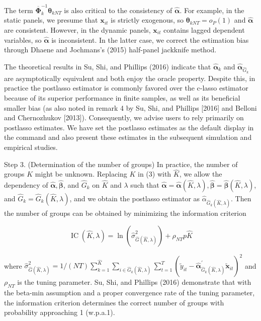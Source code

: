 \documentclass[10pt]{article}
\begin{document}
The term $\overline{\boldsymbol{\Phi}}_{k}^{-1} \boldsymbol{\theta}_{k N T}$ is also critical to the consistency of $\widehat{\boldsymbol{\alpha}}$. For example, in the static panels, we presume that $\mathbf{x}_{i t}$ is strictly exogenous, so $\boldsymbol{\theta}_{k N T}=o_{P}(1)$ and $\widehat{\boldsymbol{\alpha}}$ are consistent. However, in the dynamic panels, $\mathbf{x}_{i t}$ contains lagged dependent variables, so $\widehat{\boldsymbol{\alpha}}$ is inconsistent. In the latter case, we correct the estimation bias through Dhaene and Jochmans's (2015) half-panel jackknife method.

The theoretical results in Su, Shi, and Phillips (2016) indicate that $\widehat{\boldsymbol{\alpha}}_{k}$ and $\widehat{\boldsymbol{\alpha}}_{\widehat{G}_{k}}$ are asymptotically equivalent and both enjoy the oracle property. Despite this, in practice the postlasso estimator is commonly favored over the c-lasso estimator because of its superior performance in finite samples, as well as its beneficial smaller bias (as also noted in remark 4 by Su, Shi, and Phillips [2016] and Belloni and Chernozhukov [2013]). Consequently, we advise users to rely primarily on postlasso estimates. We have set the postlasso estimates as the default display in the command and also present these estimates in the subsequent simulation and empirical studies.

Step 3. (Determination of the number of groups) In practice, the number of groups $K$ might be unknown. Replacing $K$ in (3) with $\widehat{K}$, we allow the dependency of $\widehat{\boldsymbol{\alpha}}, \widehat{\boldsymbol{\beta}}$, and $\widehat{G}_{k}$ on $\widehat{K}$ and $\lambda$ such that $\widehat{\boldsymbol{\alpha}}=\widehat{\boldsymbol{\alpha}}(\widehat{K}, \lambda), \widehat{\boldsymbol{\beta}}=\widehat{\boldsymbol{\beta}}(\widehat{K}, \lambda)$, and $\widehat{G}_{k}=\widehat{G}_{k}(\widehat{K}, \lambda)$, and we obtain the postlasso estimator as $\widehat{\alpha}_{\widehat{G}_{k}(\widehat{K}, \lambda)}$. Then the number of groups can be obtained by minimizing the information criterion


\begin{equation*}
\operatorname{IC}(\widehat{K}, \lambda)=\ln \left(\widehat{\sigma}_{\widehat{G}(\widehat{K}, \lambda)}^{2}\right)+\rho_{N T} p \widehat{K} \tag{4}
\end{equation*}


where $\widehat{\sigma}_{\widehat{G}(\widehat{K}, \lambda)}^{2}=1 /(N T) \sum_{k=1}^{\widehat{K}} \sum_{i \in \widehat{G}_{k}(\widehat{K}, \lambda)} \sum_{t=1}^{T}\left(\widetilde{y}_{i t}-\widehat{\boldsymbol{\alpha}}_{\widehat{G}_{k}(\widehat{K}, \lambda)}^{\prime} \widetilde{\mathbf{x}}_{i t}\right)^{2}$ and $\rho_{N T}$ is the tuning parameter. Su, Shi, and Phillips (2016) demonstrate that with the beta-min assumption and a proper convergence rate of the tuning parameter, the information criterion determines the correct number of groups with probability approaching 1 (w.p.a.1).
\end{document}
